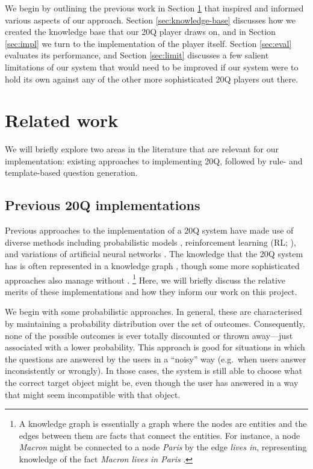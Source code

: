 \documentclass[11pt,a4paper]{article}
\begin{document}
We begin by outlining the previous work in Section \ref{sec:litreview} that inspired and informed various aspects of our approach.
Section \ref{sec:knowledge-base} discusses how we created the knowledge base that our 20Q player draws on, and in Section \ref{sec:impl} we turn to the implementation of the player itself.
Section \ref{sec:eval} evaluates its performance, and Section \ref{sec:limit} discusses a few salient limitations of our system that would need to be improved if our system were to hold its own against any of the other more sophisticated 20Q players out there.

\section{Related work}
\label{sec:litreview}

We will briefly explore two areas in the literature that are relevant for our implementation: existing approaches to implementing 20Q, followed by rule- and template-based question generation.

\subsection{Previous 20Q implementations}
\label{subsec:prev20q}

Previous approaches to the implementation of a 20Q system have made use of diverse methods including probabilistic models \citep{DeyEa2019}, reinforcement learning (RL; \citealt{HuEa2018}), and variations of artificial neural networks \citep{ReddyEa2017, Burgener2006, ToninEa2018}.
The knowledge that the 20Q system has is often represented in a knowledge graph \citep[e.g.][]{DeyEa2019}, though some more sophisticated approaches also manage without \citep[e.g.][]{HuEa2018}.%
\footnote{A knowledge graph is essentially a graph where the nodes are entities and the edges between them are facts that connect the entities.
	For instance, a node \textit{Macron} might be connected to a node \textit{Paris} by the edge \textit{lives in}, representing knowledge of the fact \textit{Macron lives in Paris} \citep[example from][]{GodinEa2019}.}
Here, we will briefly discuss the relative merits of these implementations and how they inform our work on this project.

We begin with some probabilistic approaches.
In general, these are characterised by maintaining a probability distribution over the set of outcomes.
Consequently, none of the possible outcomes is ever totally discounted or thrown away---just associated with a lower probability.
This approach is good for situations in which the questions are answered by the users in a ``noisy'' way (e.g.\ when users answer inconsistently or wrongly).
In those cases, the system is still able to choose what the correct target object might be, even though the user has answered in a way that might seem incompatible with that object.
\end{document}
